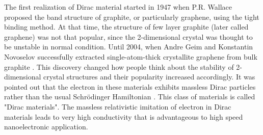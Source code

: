    The first realization of Dirac material started in 1947 when P.R. Wallace proposed the band structure of graphite, or particularly graphene, using the tight binding method.
    At that time, the structure of few layer graphite (later called graphene) was not that popular, since the 2-dimensional crystal was thought to be unstable in normal condition.
    Until 2004, when Andre Geim and Konstantin Novoselov successfully extracted single-atom-thick crystallite graphene from bulk graphite \cite{Zhang2004}.
    This discovery changed how people think about the stability of 2-dimensional crystal structures and their popularity increased accordingly.
    It was pointed out that the electron in these materials exhibits massless Dirac particles rather than the usual Schrödinger Hamiltonian \cite{CastroNeto2009}.
    This class of materials is called "Dirac materials".
    The massless relativistic imitation of electron in Dirac materials leads to very high conductivity that is advantageous to high speed nanoelectronic application.


